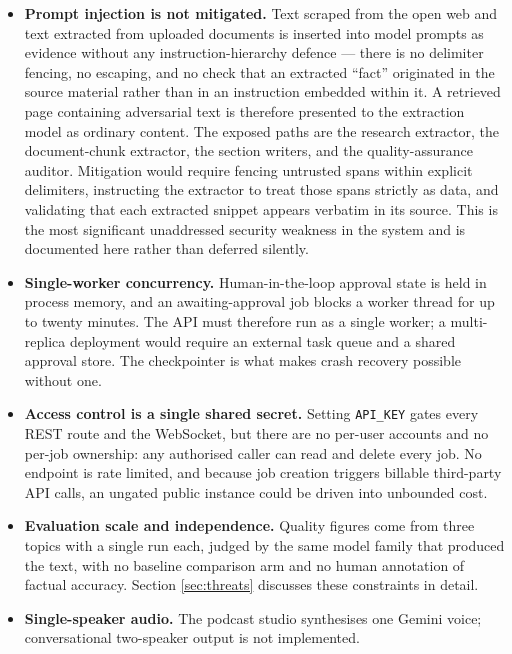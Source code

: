 \begin{itemize}
    \item \textbf{Prompt injection is not mitigated.} Text scraped from the open
      web and text extracted from uploaded documents is inserted into model
      prompts as evidence without any instruction-hierarchy defence --- there is
      no delimiter fencing, no escaping, and no check that an extracted
      ``fact'' originated in the source material rather than in an
      instruction embedded within it. A retrieved page containing adversarial
      text is therefore presented to the extraction model as ordinary content.
      The exposed paths are the research extractor, the document-chunk
      extractor, the section writers, and the quality-assurance auditor.
      Mitigation would require fencing untrusted spans within explicit
      delimiters, instructing the extractor to treat those spans strictly as
      data, and validating that each extracted snippet appears verbatim in its
      source. This is the most significant unaddressed security weakness in the
      system and is documented here rather than deferred silently.

    \item \textbf{Single-worker concurrency.} Human-in-the-loop approval state
      is held in process memory, and an awaiting-approval job blocks a worker
      thread for up to twenty minutes. The API must therefore run as a single
      worker; a multi-replica deployment would require an external task queue
      and a shared approval store. The checkpointer is what makes crash
      recovery possible without one.

    \item \textbf{Access control is a single shared secret.} Setting
      \texttt{API\_KEY} gates every REST route and the WebSocket, but there are
      no per-user accounts and no per-job ownership: any authorised caller can
      read and delete every job. No endpoint is rate limited, and because job
      creation triggers billable third-party API calls, an ungated public
      instance could be driven into unbounded cost.

    \item \textbf{Evaluation scale and independence.} Quality figures come from
      three topics with a single run each, judged by the same model family that
      produced the text, with no baseline comparison arm and no human
      annotation of factual accuracy. Section \ref{sec:threats} discusses these
      constraints in detail.

    \item \textbf{Single-speaker audio.} The podcast studio synthesises one
      Gemini voice; conversational two-speaker output is not implemented.
\end{itemize}

